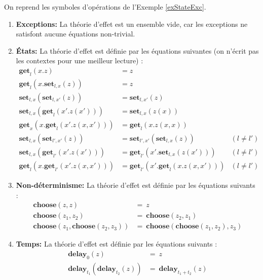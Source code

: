 	\begin{exemple}
		On reprend les symboles d'opérations de l'Exemple \ref{exStateExc}.
		
		\begin{enumerate}
			\item[] \textbf{Exceptions:} La théorie d'effet est un ensemble vide, car les exceptions ne satisfont aucune équations non-trivial.
			
			\item[] \textbf{États:} La théorie d'effet est définie par les équations suivantes (on n'écrit pas les contextes pour une meilleur lecture) :
			\begin{align*}
				\textbf{get}_l(x.z) &= z\\	
				\textbf{get}_l(x.\textbf{set}_{l,x}(z)) &= z\\	
				\textbf{set}_{l,x}(\textbf{set}_{l,x'}(z)) &= \textbf{set}_{l,x'}(z)\\
				\textbf{set}_{l,x}(\textbf{get}_{l}(x'.z(x'))) &= \textbf{set}_{l,x}(z(x))\\
				\textbf{get}_{x}(x.\textbf{get}_{l}(x'.z(x,x'))) &= \textbf{get}_{l}(x.z(x,x))\\
				\textbf{set}_{l,x}(\textbf{set}_{l',x'}(z)) &= 
				\textbf{set}_{l',x'}(\textbf{set}_{l,x}(z)) & (l \neq l')\\
				\textbf{set}_{l,x}(\textbf{get}_{l'}(x'.z(x'))) &= 
				\textbf{get}_{l'}(x'.\textbf{set}_{l,x}(z(x'))) & (l \neq l')\\
				\textbf{get}_{l}(x.\textbf{get}_{l'}(x'.z(x,x'))) &= 
				\textbf{get}_{l'}(x'.\textbf{get}_{l}(x.z(x,x'))) & (l \neq l')
			\end{align*}
			
			\item[] \textbf{Non-déterminisme:} La théorie d'effet est définie par les équations suivants :  
			\begin{align*}
				\textbf{choose}(z,z) &=~z\\
				\textbf{choose}(z_1,z_2) &=~\textbf{choose}(z_2,z_1)\\
				\textbf{choose}(z_1,\textbf{choose}(z_2,z_3)) &=~\textbf{choose}(\textbf{choose}(z_1,z_2),z_3)
			\end{align*}
		
			\item[] \textbf{Temps:} La théorie d'effet est définie par les équations suivants :  
			\begin{align*}
				\textbf{delay}_0(z)  &=~z\\
				\textbf{delay}_{t_1}(\textbf{delay}_{t_2}(z)) &=~ \textbf{delay}_{t_1 + t_2}(z)
			\end{align*}
		

\end{enumerate}
\end{exemple}
